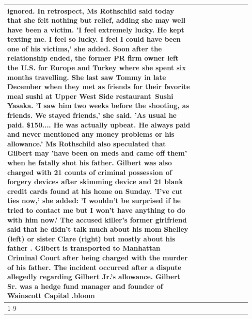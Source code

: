 \begin{table}[H]
\begin{tabular}{lllrlllll}
ignored. In retrospect, Ms Rothschild said today that she felt nothing but relief, adding she may well have been a victim. 'I feel extremely lucky. He kept texting me. I feel so lucky. I feel I could have been one of his victims,' she added. Soon after the relationship ended, the former PR firm owner left the U.S. for Europe and Turkey where she spent six months  travelling. She last saw Tommy in late December when they met as friends for their favorite meal sushi at Upper West Side restaurant Sushi Yasaka. 'I saw him two weeks before the shooting, as friends. We stayed friends,' she said. 'As usual he paid. \$150.... He was actually upbeat. He always paid and never mentioned any money problems or his allowance.' Ms Rothschild also speculated that Gilbert may 'have been on meds and came off them' when he fatally shot his father. Gilbert was also charged with 21 counts of criminal possession of forgery devices after skimming device and 21 blank credit cards found at his home on Sunday. 'I've cut ties now,' she added: 'I wouldn’t be surprised if he tried to contact me but I won’t have anything to do with him now.' The accused killer's former girlfriend said that he didn't talk much about his mom Shelley (left) or sister Clare (right) but mostly about his father . Gilbert is transported to Manhattan Criminal Court  after being charged with the murder of his father. The incident occurred after a dispute allegedly regarding Gilbert Jr.'s allowance. Gilbert Sr. was a hedge fund manager and founder of Wainscott Capital .bloom \\
\cline{1-9} \cline{2-9}

\end{tabular}
\end{table}
